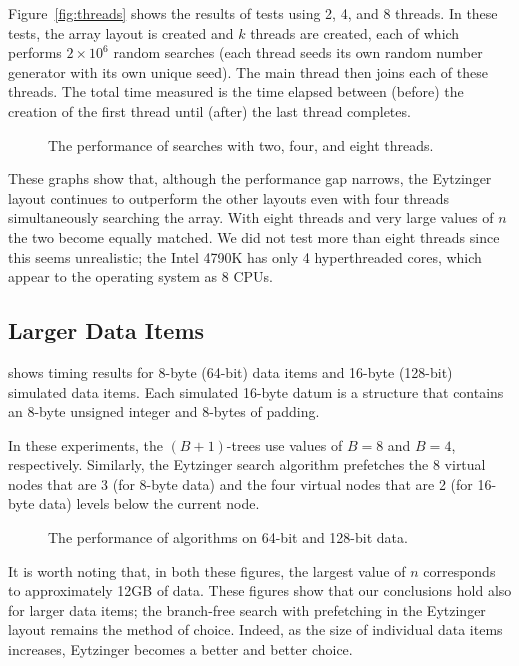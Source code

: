 \documentclass{patmorin}
\begin{document}
Figure~\ref{fig:threads} shows the results of tests
using 2, 4, and 8 threads.  In these tests, the array layout is created
and $k$ threads are created, each of which performs $2\times 10^6$
random searches (each thread seeds its own random number generator
with its own unique seed).  The main thread then joins each of these
threads. The total time measured is the time elapsed between (before)
the creation of the first thread until (after) the last thread completes.

\begin{figure}
   \caption{The performance of searches with two, four, and eight threads.}
\end{figure}

These graphs show that, although the performance gap narrows, the
Eytzinger layout continues to outperform the other layouts even with four
threads simultaneously searching the array.  With eight threads and very
large values of $n$ the two become equally matched.  We did not test more
than eight threads since this seems unrealistic; the Intel 4790K has only
4 hyperthreaded cores, which appear to the operating system as 8 CPUs.


\subsection{Larger Data Items}

 shows timing results for 8-byte (64-bit) data items and
16-byte (128-bit) simulated data items.  Each simulated 16-byte datum is a
structure that contains an 8-byte unsigned integer and 8-bytes of padding.

In these experiments, the $(B+1)$-trees use values of $B=8$ and $B=4$,
respectively. Similarly, the Eytzinger search algorithm prefetches the
8 virtual nodes that are 3 (for 8-byte data) and the four virtual nodes
that are 2 (for 16-byte data) levels below the current node.

\begin{figure}
   \caption{The performance of algorithms on 64-bit and 128-bit data.}
\end{figure}

It is worth noting that, in both these figures, the largest value of
$n$ corresponds to approximately 12GB of data. These figures show that
our conclusions hold also for larger data items; the branch-free search
with prefetching in the Eytzinger layout remains the method of choice.
Indeed, as the size of individual data items increases, Eytzinger becomes
a better and better choice.
\end{document}
